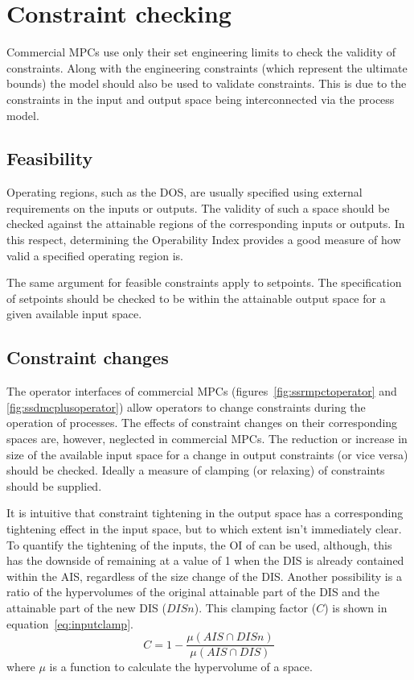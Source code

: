 \section{Constraint checking}
Commercial MPCs use only their set engineering limits to check the validity of constraints.
Along with the engineering constraints (which represent the ultimate bounds) the model should also be used to validate constraints. 
This is due to the constraints in the input and output space being interconnected via the process model.

\subsection{Feasibility}
Operating regions, such as the DOS, are usually specified using external requirements on the inputs or outputs.
The validity of such a space should be checked against the attainable regions of the corresponding inputs or outputs.
In this respect, determining the Operability Index provides a good measure of how valid a specified operating region is.

The same argument for feasible constraints apply to setpoints.
The specification of setpoints should be checked to be within the attainable output space for a given available input space.

\subsection{Constraint changes}
The operator interfaces of commercial MPCs (figures~\ref{fig:ssrmpctoperator} and \ref{fig:ssdmcplusoperator}) allow operators to change constraints during the operation of processes.
The effects of constraint changes on their corresponding spaces are, however, neglected in commercial MPCs.
The reduction or increase in size of the available input space for a change in output constraints (or vice versa) should be checked.
Ideally a measure of clamping (or relaxing) of constraints should be supplied.

It is intuitive that constraint tightening in the output space has a corresponding tightening effect in the input space, but to which extent isn't immediately clear.
To quantify the tightening of the inputs, the OI of \citet{vinsonphd} can be used, although, this has the downside of remaining at a value of 1 when the DIS is already contained within the AIS, regardless of the size change of the DIS.
Another possibility is a ratio of the hypervolumes of the original attainable part of the DIS and the attainable part of the new DIS ($DISn$).
This clamping factor ($C$) is shown in equation~\ref{eq:inputclamp}.
\begin{equation}
  \label{eq:inputclamp}
  C = 1-\frac{\mu(AIS \cap DISn)}{\mu(AIS \cap DIS)}
\end{equation}
where $\mu$ is a function to calculate the hypervolume of a space.

